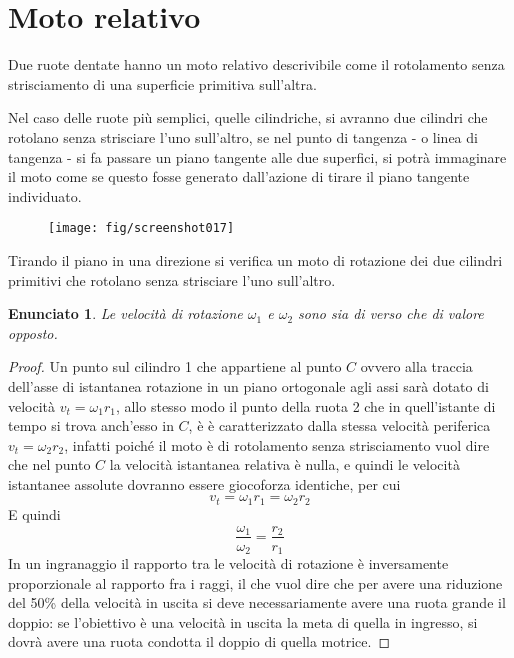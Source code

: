 \documentclass[a4paper, 15pt]{article}
\newtheorem*{en}{Enunciato}
\begin{document}
\section{Moto relativo}
\begin{adjustwidth}{2in}{}
	Due ruote dentate hanno un moto relativo descrivibile come il rotolamento senza strisciamento di una superficie primitiva sull'altra.
	
	Nel caso delle ruote più semplici, quelle cilindriche, si avranno due cilindri che rotolano senza strisciare l'uno sull'altro, se nel punto di tangenza - o linea di tangenza - si fa passare un piano tangente alle due superfici, si potrà immaginare il moto come se questo fosse generato dall'azione di tirare il piano tangente individuato.
	\begin{figure}[H]
		\centering
		\texttt{[image: fig/screenshot017]}
		\label{fig:screenshot017}
	\end{figure}
	Tirando il piano in una direzione si verifica un moto di rotazione dei due cilindri primitivi che rotolano senza strisciare l'uno sull'altro.\newline
	
	\begin{en}
		Le velocità di rotazione $\omega_1$ e $\omega_2$ sono sia di verso che di valore opposto.
	\end{en}
	\begin{proof}
		Un punto sul cilindro 1 che appartiene al punto $C$ ovvero alla traccia dell'asse di istantanea rotazione in un piano ortogonale agli assi sarà dotato di velocità $v_t = \omega_1r_1$, allo stesso modo il punto della ruota 2 che in quell'istante di tempo si trova anch'esso in $C$, è è caratterizzato dalla stessa velocità periferica $v_t = \omega_2r_2$, infatti poiché il moto è di rotolamento senza strisciamento vuol dire che nel punto $C$ la velocità istantanea relativa è nulla, e quindi le velocità istantanee assolute dovranno essere giocoforza identiche, per cui
		\[v_t = \omega_1r_1 = \omega_2r_2\] 
		E quindi
		\[ \dfrac{\omega_1}{\omega_2} = \dfrac{r_2}{r_1}\]
		In un ingranaggio il rapporto tra le velocità di rotazione è inversamente proporzionale al rapporto fra i raggi, il che vuol dire che per avere una riduzione del 50\% della velocità in uscita si deve necessariamente avere una ruota grande il doppio: se l'obiettivo è una velocità in uscita la meta di quella in ingresso, si dovrà avere una ruota condotta il doppio di quella motrice.
	\end{proof}
\end{adjustwidth}
\newpage
\end{document}

